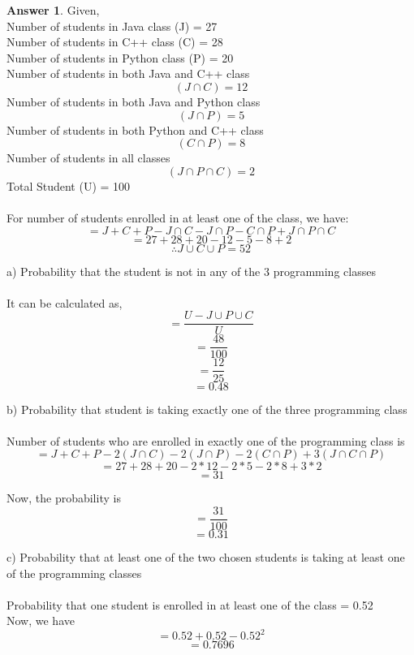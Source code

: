 \documentclass[12pt]{article}
\renewcommand{\(}{\left(}
\renewcommand{\)}{\right)}
\theoremstyle{definition}
\newtheorem*{answer}{Answer}
\begin{document}
\begin{enumerate}
\begin{enumerate}[label=\alph*.]
    \end{enumerate}

    \begin{shaded}
    \begin{answer}
        Given, \\
        Number of students in Java class (J) = 27 \\
        Number of students in C++ class (C) = 28 \\
        Number of students in Python class (P) = 20 \\
        Number of students in both Java and C++ class \[(J \cap C) = 12\]
        Number of students in both Java and Python class \[(J \cap P) = 5\]
        Number of students in both Python and C++ class \[(C \cap P) = 8\]
        Number of students in all classes \[(J \cap P \cap C) = 2\]
        Total Student (U) = 100 \\\\
        For number of students enrolled in at least one of the class, we have:
        \[= J + C + P - J \cap C - J \cap P - C \cap P + J \cap P \cap C\]
        \[= 27 + 28 + 20 - 12 - 5 - 8 + 2\]
        \[\therefore J \cup C \cup P= 52\]

        a) Probability that the student is not in any of the 3 programming classes \\\\
         It can be calculated as, \[= \frac{U - J \cup P \cup C}{U}\]
        \[= \frac{48}{100}\]
        \[= \frac{12}{25}\]
        \[= 0.48\]

        b) Probability that student is taking exactly one of the three programming class \\\\
        Number of students who are enrolled in exactly one of the programming class is 
        \[= J + C + P - 2(J \cap C) - 2(J \cap P) - 2 (C \cap P) + 3 (J \cap C \cap P)\]
        \[= 27 + 28 + 20 - 2 * 12 - 2 * 5 - 2 * 8 + 3 * 2\]
        \[= 31\]

        Now, the probability is \[= \frac{31}{100}\]
        \[= 0.31\]

        c) Probability that at least one of the two chosen students is taking at least one of the programming classes \\\\
           Probability that one student is enrolled in at least one of the class = 0.52 \\
           Now, we have
           \[= 0.52 + 0.52 - 0.52^2\]
           \[= 0.7696\]
    \end{answer}
    \end{shaded}
    \newpage



\end{enumerate}
\end{document}
